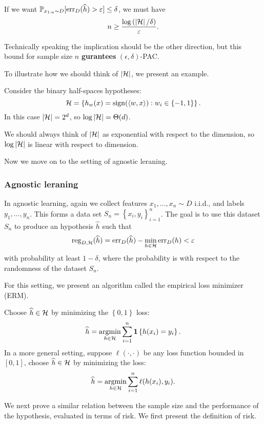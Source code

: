 \documentclass[a4paper]{article}
\begin{document}
\begin{cor}
  If we want $\mathbb{P}_{x_{1 : n} \sim D} [\operatorname{err}_D (\widehat{h}) > \varepsilon]
  \leq \delta$, we must have
  \[
  n \geq \frac{\log \left( \left\lvert \mathcal{H}\right\rvert / \delta \right)}{\varepsilon}.
  \]
\end{cor}
Technically speaking the implication should be the other direction,
but this bound for sample size $n$
\textbf{gurantees} $(\epsilon, \delta)$-PAC.

To illustrate how we should think of $\left\lvert \mathcal{H}\right\rvert$,
we present an example.
\begin{eg}
Consider the binary half-spaces hypotheses:
\[
\mathcal{H} = \left\{ h_w(x) = \operatorname{sign}(\left\langle w, x \right\rangle) :
w_i \in \left\{ -1, 1 \right\} \right\}.
\]
In this case $\left\lvert \mathcal{H}\right\rvert = 2^d$, so $\log \left\lvert \mathcal{H}\right\rvert =
\Theta(d)$.

We should always think of $\left\lvert \mathcal{H}\right\rvert$
as exponential with respect to the dimension, so
$\log \left\lvert \mathcal{H}\right\rvert$ is linear with respect to dimension.
\end{eg}

Now we move on to the setting of agnostic leraning.

\subsubsection{Agnostic leraning}

In agnostic learning, again we collect features $x_1, \dots,
x_n \sim D$ i.i.d., and labels $y_1, \dots, y_n$. This forms a
data set $S_n = \left\{ x_i, y_i \right\}_{i=1}^n$. The
goal is to use this dataset $S_n$ to produce an hypothesis
$\hat{h}$ such that
\[
\operatorname{reg}_{D, \mathcal{H}} (\widehat{h}) =
\operatorname{err}_D (\widehat{h}) - \min_{h \in \mathcal{H}} \operatorname{err}_D (h) < \varepsilon
\]
with probability at least $1 - \delta$, where the probability
is with respect to the randomness of the dataset $S_n$.

For this setting, we present an algorithm called the empirical
loss minimizer (ERM).
\begin{algorithm}
  Choose $\widehat{h} \in \mathcal{H}$ by minimizing the $\left\{ 0,1
   \right\}$ loss:
  \[
  \widehat{h} = \operatorname*{argmin}_{h \in \mathcal{H}} \sum_{i=1}^n \mathbf{1} \left\{
    h(x_i) = y_i
   \right\}.
  \]
  In a more general setting, suppose $\ell(\cdot, \cdot)$
  be any loss function bounded in $[0, 1]$, choose
  $\widehat{h} \in \mathcal{H}$ by minimizing the loss:
  \[
  \widehat{h} = \operatorname*{argmin}_{h \in \mathcal{H}} \sum_{i=1}^n \ell(h(x_i),
  y_i).
  \]
\end{algorithm}

We next prove a similar relation between the sample
size and the performance of the hypothesis, evaluated
in terms of risk. We first present the definition
of risk.
\end{document}
